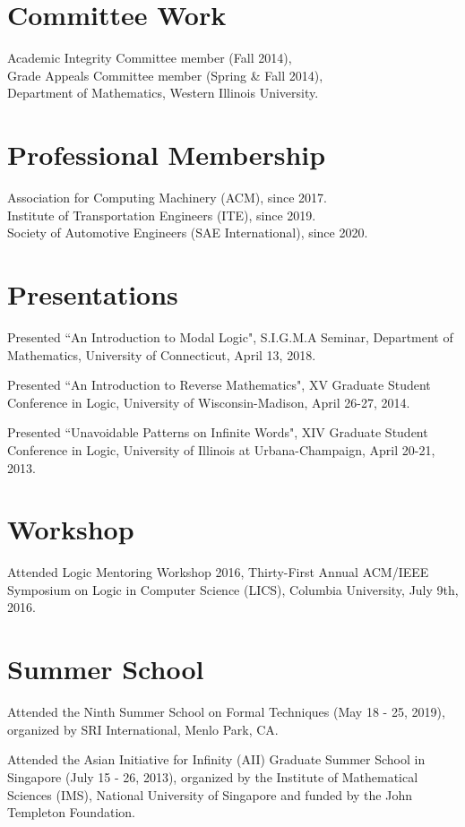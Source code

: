 \documentclass[margin]{res}
\begin{document}
\begin{resume}
\section{Committee Work}
Academic Integrity Committee member (Fall 2014),\\
Grade Appeals Committee member (Spring \& Fall 2014),\\
Department of Mathematics, Western Illinois University.


\section{Professional Membership}
Association for Computing Machinery (ACM), since 2017.\\
Institute of Transportation Engineers (ITE), since 2019.\\
Society of Automotive Engineers (SAE International), since 2020.

\section{Presentations}
Presented ``An Introduction to Modal Logic", S.I.G.M.A Seminar, Department of Mathematics, University of Connecticut, April 13, 2018.

Presented ``An Introduction to Reverse Mathematics", XV Graduate Student Conference in Logic, University of Wisconsin-Madison, April 26-27, 2014.

Presented ``Unavoidable Patterns on Infinite Words", XIV Graduate Student Conference in Logic, University of Illinois at Urbana-Champaign, April 20-21, 2013.

\section{Workshop}
Attended Logic Mentoring Workshop 2016, Thirty-First Annual ACM/IEEE Symposium on
Logic in Computer Science (LICS), Columbia University, July 9th, 2016.

\section{Summer School}
Attended the Ninth Summer School on Formal Techniques (May 18 - 25, 2019),
organized by SRI International, Menlo Park, CA.

Attended the Asian Initiative for Infinity (AII) Graduate Summer School in Singapore (July 15 - 26, 2013), organized by the Institute of Mathematical Sciences (IMS), National University of Singapore and funded by the John Templeton Foundation.



\end{resume}
\end{document}
